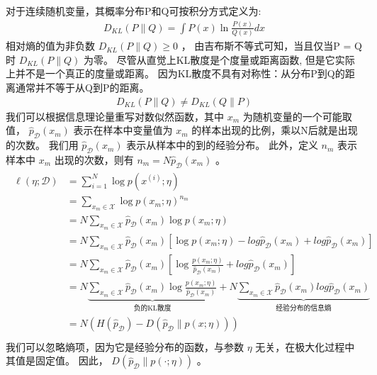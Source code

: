 \documentclass[letterpaper,10pt,english]{sphinxmanual}
\begin{document}
对于连续随机变量，其概率分布P和Q可按积分方式定义为:
\begin{equation}\label{equation:指数族/content:指数族/content:33}
\begin{split}D_{KL}(P \parallel Q) = \int P(x) \ln \frac{P(x)}{Q(x)} dx\end{split}
\end{equation}
相对熵的值为非负数 \(D_{KL}(P \parallel Q) \ge 0\) ，
由吉布斯不等式可知，当且仅当P = Q时 \(D_{KL}(P \parallel Q)\) 为零。
尽管从直觉上KL散度是个度量或距离函数, 但是它实际上并不是一个真正的度量或距离。
因为KL散度不具有对称性：从分布P到Q的距离通常并不等于从Q到P的距离。
\begin{equation}\label{equation:指数族/content:指数族/content:34}
\begin{split}D_{KL}(P \parallel Q) \neq D_{KL}(Q \parallel P)\end{split}
\end{equation}
我们可以根据信息理论量重写对数似然函数，其中
\(x_m\) 为随机变量的一个可能取值，
\(\hat{p}_{\mathcal{D}}(x_m)\) 表示在样本中变量值为 \(x_m\)
的样本出现的比例，乘以N后就是出现的次数。
我们用 \(\hat{p}_{\mathcal{D}}(x_m)\) 表示从样本中的到的经验分布。
此外，定义 \(n_m\) 表示样本中  \(x_m\) 出现的次数，则有
\(n_m=N \hat{p}_{\mathcal{D}}(x_m)\) 。
\begin{align}\label{equation:指数族/content:指数族/content:35}\!\begin{aligned}
\ell(\eta;\mathcal{D}) &= \sum_{i=1}^{N} \log p(x^{(i)};\eta)\\
&= \sum_{x_m \in \mathcal{X} } \log  p(x_m;\eta)^{n_{m}}\\
&= N \sum_{x_m \in \mathcal{X} } \hat{p}_{\mathcal{D}}(x_m) \log p(x_m;\eta)\\
&= N \sum_{x_m \in \mathcal{X} } \hat{p}_{\mathcal{D}}(x_m) [ \log p(x_m;\eta) -log \hat{p}_{\mathcal{D}}(x_m) + log  \hat{p}_{\mathcal{D}}(x_m) ]\\
&= N \sum_{x_m \in \mathcal{X} } \hat{p}_{\mathcal{D}}(x_m) [ \log \frac{p(x_m;\eta)}{\hat{p}_{\mathcal{D}}(x_m)} + log  \hat{p}_{\mathcal{D}}(x_m) ]\\
&= N \underbrace{\sum_{x_m \in \mathcal{X} } \hat{p}_{\mathcal{D}}(x_m)
\log \frac{p(x_m;\eta)}{\hat{p}_{\mathcal{D}}(x_m)}}_{\text{负的KL散度}}
+ N \underbrace{ \sum_{x_m \in \mathcal{X} } \hat{p}_{\mathcal{D}}(x_m) log  \hat{p}_{\mathcal{D}}(x_m)}_{\text{经验分布的信息熵}}\\
&= N( H(\hat{p}_{\mathcal{D}}) - D( \hat{p}_{\mathcal{D}} \parallel p(x ; \eta)  ) )\\
\end{aligned}\end{align}
我们可以忽略熵项，因为它是经验分布的函数，与参数 \(\eta\) 无关，在极大化过程中其值是固定值。
因此，
\(D( \hat{p}_{\mathcal{D}} \parallel p(\cdot ; \eta))\) 。
\end{document}
